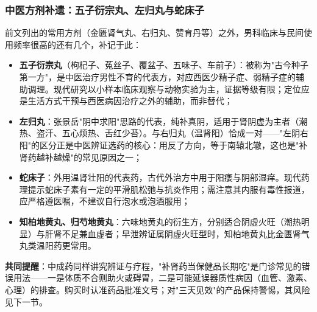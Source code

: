 \subsubsection{中医方剂补遗：五子衍宗丸、左归丸与蛇床子}

前文列出的常用方剂（金匮肾气丸、右归丸、赞育丹等）之外，男科临床与民间使用频率很高的还有几个，补记于此：

\begin{itemize}
\item \textbf{五子衍宗丸}（枸杞子、菟丝子、覆盆子、五味子、车前子）：被称为"古今种子第一方"，是中医治疗男性不育的代表方，对应西医少精子症、弱精子症的辅助调理。现代研究以小样本临床观察与动物实验为主，证据等级有限；定位应是生活方式干预与西医病因治疗之外的辅助，而非替代；
\item \textbf{左归丸}：张景岳"阴中求阳"思路的代表，纯补真阴，适用于肾阴虚为主者（潮热、盗汗、五心烦热、舌红少苔）。与右归丸（温肾阳）恰成一对——"左阴右阳"的区分正是中医辨证选药的核心：用反了方向，等于南辕北辙，这也是"补肾药越补越燥"的常见原因之一；
\item \textbf{蛇床子}：外用温肾壮阳的代表药，古代外治方中用于阳痿与阴部湿痒。现代药理提示蛇床子素有一定的平滑肌松弛与抗炎作用；需注意其内服有毒性报道，应严格遵医嘱，不建议自行泡水或泡酒服用；
\item \textbf{知柏地黄丸、归芍地黄丸}：六味地黄丸的衍生方，分别适合阴虚火旺（潮热明显）与肝肾不足兼血虚者；早泄辨证属阴虚火旺型时，知柏地黄丸比金匮肾气丸类温阳药更常用。
\end{itemize}

\textbf{共同提醒}：中成药同样讲究辨证与疗程，"补肾药当保健品长期吃"是门诊常见的错误用法——一是体质不合则助火或碍胃，二是可能延误器质性病因（血管、激素、心理）的排查。购买时认准药品批准文号；对"三天见效"的产品保持警惕，其风险见下一节。
